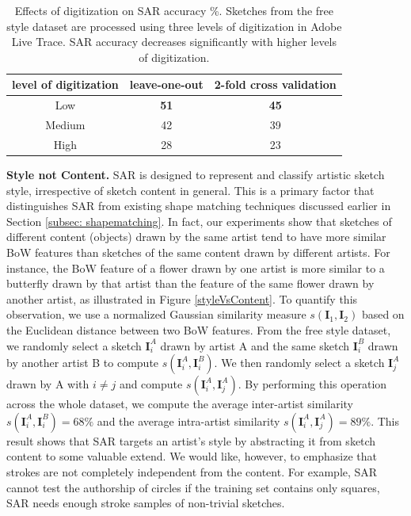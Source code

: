\vspace{-1mm}
\begin{table}[!htbp]
\caption {Effects of digitization on SAR accuracy \%. Sketches from the free style dataset are processed using three levels of digitization in Adobe Live Trace. SAR accuracy decreases significantly with higher levels of digitization.}
\label{table:digitization}
\vspace{-2mm}
\centering
\small
\begin{tabular}{c | c | c}
level of digitization& leave-one-out & 2-fold cross validation \\ \hline

Low       & \textbf{51} &  \textbf{45}\\
Medium       & 42 &  39\\
High      & 28 &  23\\
\end{tabular}\vspace{-2mm}
\end{table}


\noindent\textbf{Style not Content.} SAR is designed to represent and classify artistic sketch style, irrespective of sketch content in general. This is a primary factor that distinguishes SAR from existing shape matching techniques discussed earlier in Section \ref{subsec: shapematching}. In fact, our experiments show that sketches of different content (objects) drawn by the same artist tend to have more similar BoW features than sketches of the same content drawn by different artists. For instance, the BoW feature of a flower drawn by one artist is more similar to a butterfly drawn by that artist than the feature of the same flower drawn by another artist, as illustrated in Figure \ref{styleVsContent}. To quantify this observation, we use a normalized Gaussian similarity measure $s(\mathbf{I}_1,\mathbf{I}_2)$ based on the Euclidean distance between two BoW features. From the free style dataset, we randomly select a sketch $\mathbf{I}_i^A$ drawn by artist A and the same sketch $\mathbf{I}_i^B$  drawn by another artist B to compute $s(\mathbf{I}_i^A,\mathbf{I}_i^B)$. We then randomly select a sketch $\mathbf{I}_j^A$ drawn by A with $i\neq j$ and compute $s(\mathbf{I}_i^A,\mathbf{I}_j^A)$. By performing this operation across the whole dataset, we compute the average inter-artist similarity $s(\mathbf{I}_i^A,\mathbf{I}_i^B)=68\%$ and the average intra-artist similarity $s(\mathbf{I}_i^A,\mathbf{I}_j^A)=89\%$. This result shows that SAR targets an artist's style by abstracting it from sketch content to some valuable extend. We would like, however, to emphasize that strokes are not completely independent from the content. For example, SAR cannot test the authorship of circles if the training set contains only squares, SAR needs enough stroke samples of non-trivial sketches.



